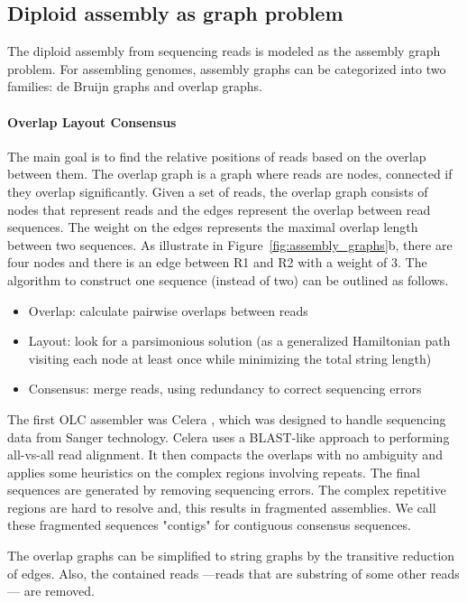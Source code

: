 \subsection{Diploid assembly as graph problem}
The diploid assembly from sequencing reads is modeled as the assembly graph problem. For assembling genomes, assembly graphs can be categorized into two families: de Bruijn graphs and overlap graphs.
\paragraph{Overlap Layout Consensus}
The main goal is to find the relative positions of reads based on the overlap between them.
The overlap graph is a graph where reads are
nodes, connected if they overlap significantly.
Given a set of reads, the overlap graph consists of nodes that represent reads and the edges represent the overlap between read sequences.
The weight on the edges represents the maximal overlap length between two sequences. As illustrate in Figure~\ref{fig:assembly_graphs}b, there are four nodes and there is an edge between R1 and R2 with a weight of 3.
The algorithm to construct one sequence (instead of two) can be outlined as follows.
\begin{itemize}
 \item Overlap: calculate pairwise overlaps between reads
 \item  Layout: look for a parsimonious solution (as a generalized Hamiltonian path visiting each node at least once while minimizing the total string length)
 \item  Consensus: merge reads, using redundancy to correct sequencing errors
\end{itemize}

The first OLC assembler was Celera \citep{myers2000whole}, which was designed to handle sequencing data from Sanger technology.
Celera uses a BLAST-like approach to performing all-vs-all read alignment. It then compacts the overlaps with no ambiguity and applies some heuristics on the complex regions involving repeats. The final sequences
are generated by removing sequencing errors. The complex repetitive regions are hard to resolve and, this results in fragmented assemblies.  We call these fragmented sequences
"contigs" for contiguous consensus sequences. 

The overlap graphs can be simplified to string graphs by the transitive reduction of edges.
Also, the contained reads ---reads that are substring of some
other reads --- are removed.

